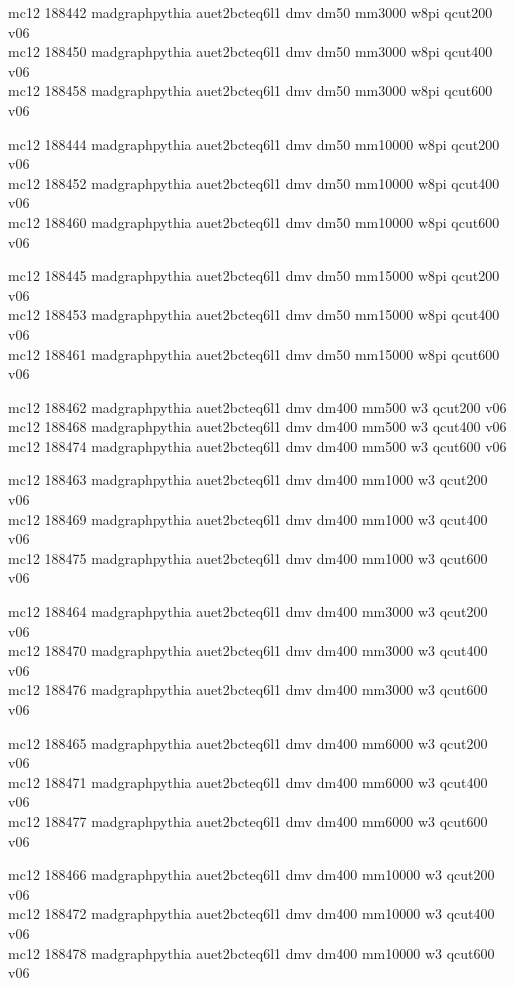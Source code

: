mc12 188442 madgraphpythia auet2bcteq6l1 dmv dm50 mm3000 w8pi qcut200 v06\\
mc12 188450 madgraphpythia auet2bcteq6l1 dmv dm50 mm3000 w8pi qcut400 v06\\
mc12 188458 madgraphpythia auet2bcteq6l1 dmv dm50 mm3000 w8pi qcut600 v06

mc12 188444 madgraphpythia auet2bcteq6l1 dmv dm50 mm10000 w8pi qcut200 v06\\
mc12 188452 madgraphpythia auet2bcteq6l1 dmv dm50 mm10000 w8pi qcut400 v06\\
mc12 188460 madgraphpythia auet2bcteq6l1 dmv dm50 mm10000 w8pi qcut600 v06

mc12 188445 madgraphpythia auet2bcteq6l1 dmv dm50 mm15000 w8pi qcut200 v06\\
mc12 188453 madgraphpythia auet2bcteq6l1 dmv dm50 mm15000 w8pi qcut400 v06\\
mc12 188461 madgraphpythia auet2bcteq6l1 dmv dm50 mm15000 w8pi qcut600 v06

mc12 188462 madgraphpythia auet2bcteq6l1 dmv dm400 mm500 w3 qcut200 v06\\
mc12 188468 madgraphpythia auet2bcteq6l1 dmv dm400 mm500 w3 qcut400 v06\\
mc12 188474 madgraphpythia auet2bcteq6l1 dmv dm400 mm500 w3 qcut600 v06

mc12 188463 madgraphpythia auet2bcteq6l1 dmv dm400 mm1000 w3 qcut200 v06\\
mc12 188469 madgraphpythia auet2bcteq6l1 dmv dm400 mm1000 w3 qcut400 v06\\
mc12 188475 madgraphpythia auet2bcteq6l1 dmv dm400 mm1000 w3 qcut600 v06

mc12 188464 madgraphpythia auet2bcteq6l1 dmv dm400 mm3000 w3 qcut200 v06\\
mc12 188470 madgraphpythia auet2bcteq6l1 dmv dm400 mm3000 w3 qcut400 v06\\
mc12 188476 madgraphpythia auet2bcteq6l1 dmv dm400 mm3000 w3 qcut600 v06

mc12 188465 madgraphpythia auet2bcteq6l1 dmv dm400 mm6000 w3 qcut200 v06\\
mc12 188471 madgraphpythia auet2bcteq6l1 dmv dm400 mm6000 w3 qcut400 v06\\
mc12 188477 madgraphpythia auet2bcteq6l1 dmv dm400 mm6000 w3 qcut600 v06

mc12 188466 madgraphpythia auet2bcteq6l1 dmv dm400 mm10000 w3 qcut200 v06\\
mc12 188472 madgraphpythia auet2bcteq6l1 dmv dm400 mm10000 w3 qcut400 v06\\
mc12 188478 madgraphpythia auet2bcteq6l1 dmv dm400 mm10000 w3 qcut600 v06


